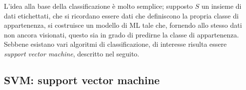 \documentclass{subfiles}
\begin{document}
L'idea alla base della classificazione è molto semplice; supposto $S$ un insieme di dati etichettati,
che si ricordano essere dati che definiscono la propria classe di appartenenza,
si costruisce un modello di ML tale che, fornendo allo stesso dati non ancora visionati, questo sia in grado di predirne la classe di appartenenza.
Sebbene esistano vari algoritmi di classificazione, di interesse risulta essere \emph{support vector machine}, descritto nel seguito.

\subsection{SVM: support vector machine}

\end{document}
